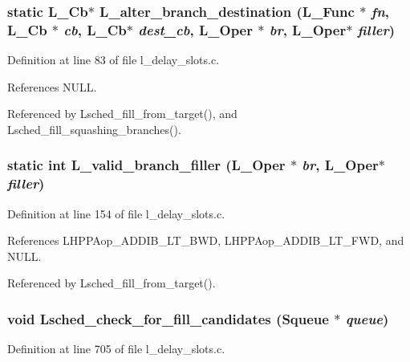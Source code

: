\subsubsection{\setlength{\rightskip}{0pt plus 5cm}static L\_\-Cb$\ast$ L\_\-alter\_\-branch\_\-destination (L\_\-Func $\ast$ {\em fn}, L\_\-Cb $\ast$ {\em cb}, L\_\-Cb$\ast$ {\em dest\_\-cb}, L\_\-Oper $\ast$ {\em br}, L\_\-Oper$\ast$ {\em filler})\hspace{0.3cm}{\tt  [static]}}\label{l__delay__slots_8c_9da40d4878761584579198f37f3a2528}




Definition at line 83 of file l\_\-delay\_\-slots.c.

References NULL.

Referenced by Lsched\_\-fill\_\-from\_\-target(), and Lsched\_\-fill\_\-squashing\_\-branches().
\subsubsection{\setlength{\rightskip}{0pt plus 5cm}static int L\_\-valid\_\-branch\_\-filler (L\_\-Oper $\ast$ {\em br}, L\_\-Oper$\ast$ {\em filler})\hspace{0.3cm}{\tt  [static]}}\label{l__delay__slots_8c_14aa11b42e71eebed3abe58e18b35125}




Definition at line 154 of file l\_\-delay\_\-slots.c.

References LHPPAop\_\-ADDIB\_\-LT\_\-BWD, LHPPAop\_\-ADDIB\_\-LT\_\-FWD, and NULL.

Referenced by Lsched\_\-fill\_\-from\_\-target().
\subsubsection{\setlength{\rightskip}{0pt plus 5cm}void Lsched\_\-check\_\-for\_\-fill\_\-candidates (\bf{Squeue} $\ast$ {\em queue})}\label{l__delay__slots_8c_ce6a81e6030547cf9c25b9bf1927480c}




Definition at line 705 of file l\_\-delay\_\-slots.c.


